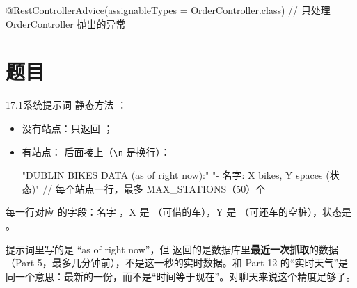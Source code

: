 \begin{java}
@RestControllerAdvice(assignableTypes = OrderController.class)   // 只处理 OrderController 抛出的异常
\end{java}

\section{题目}

\begin{task}{17.1\quad 系统提示词}
静态方法 ：
\begin{itemize}
  \item 没有站点：只返回 ；
  \item 有站点： 后面接上（\texttt{\textbackslash n} 是换行）：
\begin{plaincode}
"\n\nLIVE DUBLIN BIKES DATA (as of right now):"
"\n- 名字: X bikes, Y spaces (状态)"        // 每个站点一行，最多 MAX_STATIONS（50）个
\end{plaincode}
\end{itemize}
每一行对应  的字段：名字 ，X 是 （可借的车），Y 是 （可还车的空桩），状态是 。
\end{task}

\begin{note}
提示词里写的是 “as of right now”，但  返回的是数据库里\textbf{最近一次抓取}的数据（Part 5，最多几分钟前），不是这一秒的实时数据。和 Part 12 的“实时天气”是同一个意思：最新的一份，而不是“时间等于现在”。对聊天来说这个精度足够了。
\end{note}

